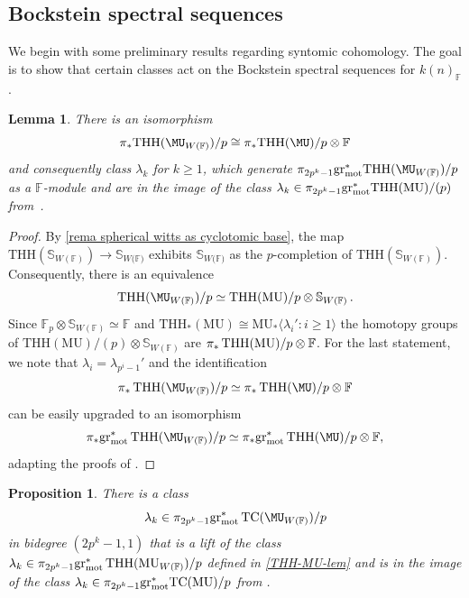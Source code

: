 \documentclass[english,10pt]{amsart}
\newcommand{\sphwf}{\mathbb{S}_{W(\mathbb{F)}}}
\newcommand{\field}{\mathbb{F}}
\newtheorem{prop}{Proposition}[section]
\newtheorem{lemm}{Lemma}[section]
\theoremstyle{definition}
\numberwithin{equation}{section}
\DeclareMathOperator{\TC}{TC}
\DeclareMathOperator{\thh}{\ensuremath{\textup{THH}}}
\newcommand{\THH}{\thh}
\newcommand{\grmot}{\mathrm{gr}_{\textup{mot}}^*}
\begin{document}
\subsection{Bockstein spectral sequences}
We begin with some preliminary results regarding syntomic cohomology. The goal is to show that certain classes act on the Bockstein spectral sequences for $k(n)_{\field}$.

\begin{lemm}\label{THH-MU-lem}
There is an isomorphism
\[ \pi_*\mathrm{THH}(\MU_{W(\field)})/p\cong\pi_*\mathrm{THH}(\MU)/p\otimes \field
\]
and consequently class $\lambda_k$ for $k\ge 1$, which generate $\pi_{2p^k-1}\grmot\mathrm{THH}(\MU_{W(\field)})/p$  as a $\field$-module and are in the image of the class $\lambda_k\in \pi_{2p^k-1}\grmot\mathrm{THH}(\mathrm{MU})/(p)$ from~\cite[Definition~2.3.2]{angelini2024syntomic}. 
\end{lemm}
\begin{proof}
By \autoref{rema spherical witts as cyclotomic base}, the map $\mathrm{THH}(\mathbb{S}_{W(\field)})\to \sphwf$ exhibits  $\sphwf$ as the $p$-completion of $\mathrm{THH}(\mathbb{S}_{W(\field)})$. Consequently, there is an equivalence
\[
\mathrm{THH}(\MU_{W(\field)})/p\simeq \mathrm{THH}(\mathrm{MU})/p\otimes \mathbb{S}_{W(\field)}\,.\]
Since $\mathbb{F}_p\otimes \mathbb{S}_{W(\field)}\simeq \field$ and 
$\mathrm{THH}_*(\mathrm{MU})\cong \mathrm{MU}_*\langle \lambda_i' : i\ge 1\rangle$
the homotopy groups of $\mathrm{THH}(\mathrm{MU})/(p)\otimes \mathbb{S}_{W(\field)}$ are 
$\pi_*\THH(\mathrm{MU})/p\otimes \field$. 
For the last statement, we note that $\lambda_i=\lambda_{p^i-1}'$ and the identification 
\[ \pi_*\THH(\MU_{W(\field)})/p\simeq \pi_*\THH(\MU)/p\otimes \field
\]
can be easily upgraded to an isomorphism
\[ \pi_*\grmot\THH(\MU_{W(\field)})/p\simeq \pi_*\grmot\THH(\MU)/p\otimes \field,
\]
adapting the proofs of \cite[Proposition~2.2.6,~Proposition~2.3.1]{angelini2024syntomic}. 
\end{proof}


\begin{prop}\label{lambda-class}
There is a class 
\[
\lambda_k\in \pi_{2p^k-1}\grmot\TC(\MU_{W(\field)})/p
\]
in bidegree $(2p^k-1,1)$ that is a lift of the class 
$\lambda_k\in \pi_{2p^{k}-1}\grmot\THH(\mathrm{MU}_{W(\field)})/p$ defined in \autoref{THH-MU-lem} and is in the image of the class $\lambda_k\in \pi_{2p^k-1}\grmot\mathrm{TC}(\mathrm{MU})/p$ from \cite[Definition 3.2.4]{angelini2024syntomic}.
\end{prop}
\end{document}
